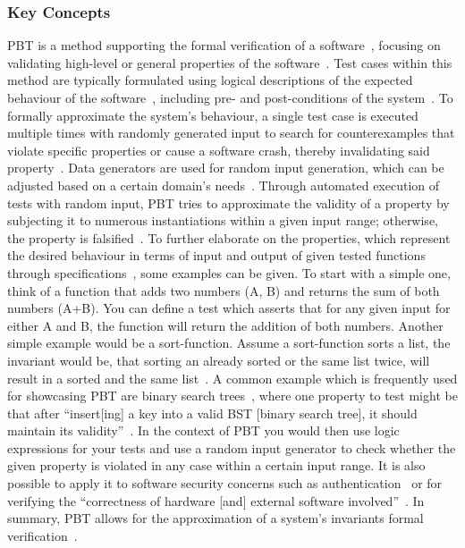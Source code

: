 \documentclass[runningheads]{llncs}
\begin{document}
\subsubsection{Key Concepts}
PBT is a method supporting the formal verification of a software~\cite{Chen2022,Fink1997,Honarvar2020,Paraskevopoulou2015}, focusing on validating high-level or general properties of the software~\cite{Fink1997,Honarvar2020,Corgozinho2023}. Test cases within this method are typically formulated using logical descriptions of the expected behaviour of the software~\cite{Chen2022,Fink1997,Honarvar2020,Loescher2017,Corgozinho2023}, including pre- and post-conditions of the system~\cite{Honarvar2020}. To formally approximate the system's behaviour, a single test case is executed multiple times with randomly generated input to search for counterexamples that violate specific properties or cause a software crash, thereby invalidating said property~\cite{Chen2022,Loescher2017,Padhye2019,ElazarMittelman2023,Paraskevopoulou2015,Corgozinho2023}. Data generators are used for random input generation, which can be adjusted based on a certain domain's needs~\cite{Chen2022,Loescher2017,Padhye2019,ElazarMittelman2023}. Through automated execution of tests with random input, PBT tries to approximate the validity of a property by subjecting it to numerous instantiations within a given input range; otherwise, the property is falsified~\cite{Fink1997,ElazarMittelman2023,Corgozinho2023,Paraskevopoulou2015}. To further elaborate on the properties, which represent the desired behaviour in terms of input and output of given tested functions through specifications~\cite{Chen2022,Fink1997,Loescher2017}, some examples can be given. To start with a simple one, think of a function that adds two numbers (A, B) and returns the sum of both numbers (A+B). You can define a test which asserts that for any given input for either A and B, the function will return the addition of both numbers. Another simple example would be a sort-function. Assume a sort-function sorts a list, the invariant would be, that sorting an already sorted or the same list twice, will result in a sorted and the same list~\cite{Corgozinho2023}. A common example which is frequently used for showcasing PBT are binary search trees~\cite{Corgozinho2023,Shi2023}, where one property to test might be that after ``insert[ing] a key into a valid BST [binary search tree], it should maintain its validity''~\cite{Shi2023}. In the context of PBT you would then use logic expressions for your tests and use a random input generator to check whether the given property is violated in any case within a certain input range. It is also possible to apply it to software security concerns such as authentication~\cite{Fink1997} or for verifying the ``correctness of hardware [and] external software involved''~\cite{Chen2022}. In summary, PBT allows for the approximation of a system's invariants formal verification~\cite{Fink1997,ElazarMittelman2023,Corgozinho2023}.
\end{document}
